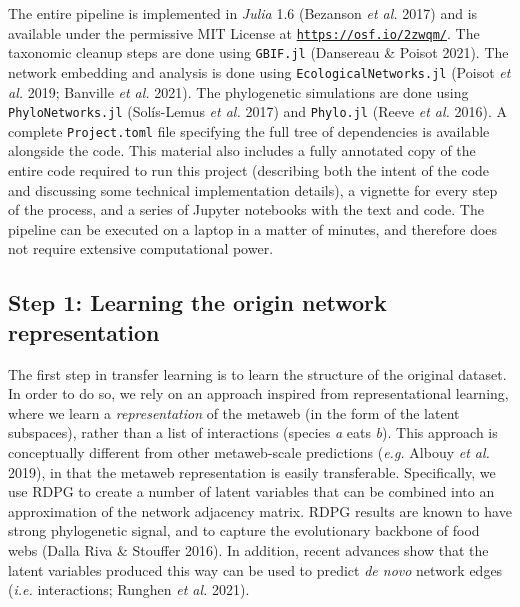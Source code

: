\documentclass[10pt,oneside]{article}
\begin{document}
The entire pipeline is implemented in \emph{Julia} 1.6 (Bezanson
\emph{et al.} 2017) and is available under the permissive MIT License at
\href{https://osf.io/2zwqm/}{\texttt{https://osf.io/2zwqm/}}. The
taxonomic cleanup steps are done using \texttt{GBIF.jl} (Dansereau \&
Poisot 2021). The network embedding and analysis is done using
\texttt{EcologicalNetworks.jl} (Poisot \emph{et al.} 2019; Banville
\emph{et al.} 2021). The phylogenetic simulations are done using
\texttt{PhyloNetworks.jl} (Solís-Lemus \emph{et al.} 2017) and
\texttt{Phylo.jl} (Reeve \emph{et al.} 2016). A complete
\texttt{Project.toml} file specifying the full tree of dependencies is
available alongside the code. This material also includes a fully
annotated copy of the entire code required to run this project
(describing both the intent of the code and discussing some technical
implementation details), a vignette for every step of the process, and a
series of Jupyter notebooks with the text and code. The pipeline can be
executed on a laptop in a matter of minutes, and therefore does not
require extensive computational power.

\hypertarget{step-1-learning-the-origin-network-representation}{%
\subsection{Step 1: Learning the origin network
representation}\label{step-1-learning-the-origin-network-representation}}

The first step in transfer learning is to learn the structure of the
original dataset. In order to do so, we rely on an approach inspired
from representational learning, where we learn a \emph{representation}
of the metaweb (in the form of the latent subspaces), rather than a list
of interactions (species \emph{a} eats \emph{b}). This approach is
conceptually different from other metaweb-scale predictions (\emph{e.g.}
Albouy \emph{et al.} 2019), in that the metaweb representation is easily
transferable. Specifically, we use RDPG to create a number of latent
variables that can be combined into an approximation of the network
adjacency matrix. RDPG results are known to have strong phylogenetic
signal, and to capture the evolutionary backbone of food webs (Dalla
Riva \& Stouffer 2016). In addition, recent advances show that the
latent variables produced this way can be used to predict \emph{de novo}
network edges (\emph{i.e.} interactions; Runghen \emph{et al.} 2021).
\end{document}
